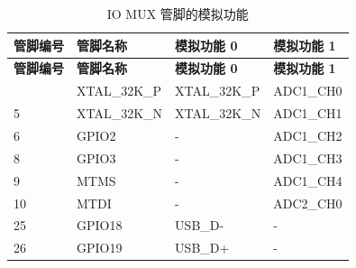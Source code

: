    \begin{longtable}[c]{|p{2cm}|p{2.5cm}|p{3cm}|p{3cm}| }
   \caption{IO MUX 管脚的模拟功能}
    \label{tab:iomuxgpio-iomax-pins-analog-functions} \\
        \hline
        \rowcolor{lightgray}
        \textbf{管脚编号} & \textbf{管脚名称} & \textbf{模拟功能 0} & \textbf{模拟功能 1} \\
        \hline
        \endfirsthead
        \hline
        \rowcolor{lightgray}
        \textbf{管脚编号} & \textbf{管脚名称} & \textbf{模拟功能 0} & \textbf{模拟功能 1} \\
        \hline
        \endhead
        \endfoot
 4 & XTAL\_32K\_P   & XTAL\_32K\_P & ADC1\_CH0                  \\
\hline
 5 & XTAL\_32K\_N   & XTAL\_32K\_N & ADC1\_CH1                 \\
\hline
 6 & GPIO2   & -            & ADC1\_CH2                 \\
\hline
 8 & GPIO3   & -            & ADC1\_CH3                 \\
\hline
9 & MTMS   & -            & ADC1\_CH4                  \\
\hline
10 & MTDI   & -            & ADC2\_CH0                  \\
\hline
25 & GPIO18   & USB\_D-      & -                          \\
\hline
26 & GPIO19   & USB\_D+      & -                          \\\hline


\end{longtable}

